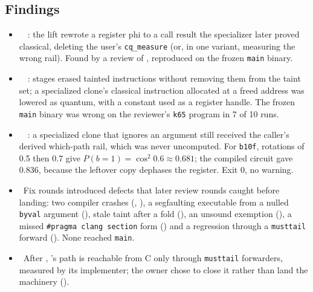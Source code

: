 \subsection*{Findings}
\begin{itemize}
  \item \fconfirmed\ \fpreexisting\ : the lift rewrote a register phi to
    a call result the specializer later proved classical, deleting the user's
    \texttt{cq\_measure} (or, in one variant, measuring the wrong rail). Found
    by a review of , reproduced on the frozen \texttt{main} binary.
  \item \fconfirmed\ \fpreexisting\ : stages erased tainted instructions
    without removing them from the taint set; a specialized clone's classical
    instruction allocated at a freed address was lowered as quantum, with a
    constant used as a register handle. The frozen \texttt{main} binary was
    wrong on the reviewer's \texttt{k65} program in 7 of 10 runs.
  \item \fconfirmed\ \fpreexisting\ : a specialized clone that ignores
    an argument still received the caller's derived which-path rail, which was
    never uncomputed. For \texttt{b10f}, rotations of 0.5 then 0.7 give
    $P(b{=}1)=\cos^2 0.6 \approx 0.681$; the compiled circuit gave 0.836,
    because the leftover copy dephases the register. Exit 0, no warning.
  \item \fconfirmed\ Fix rounds introduced defects that later review rounds
    caught before landing: two compiler crashes (, ), a
    segfaulting executable from a nulled \texttt{byval} argument (),
    stale taint after a fold (), an unsound exemption (), a
    missed \texttt{\#pragma clang section} form () and a regression
    through a \texttt{musttail} forward (). None reached \texttt{main}.
  \item \foverdecline\ After , 's path is reachable from C
    only through \texttt{musttail} forwarders, measured by its implementer;
    the owner chose to close it rather than land the machinery ().
\end{itemize}

